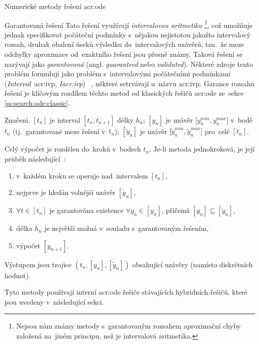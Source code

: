 \documentclass[thesis=M,czech]{FITthesis}[2012/06/26]
\newcommand{\acrlabel}[1]{acr:#1}
\newcommand{\acr}[1]{\acrshort{\acrlabel{#1}}}
\newcommand{\hl}[1]{\textit{#1}}
\newcommand{\name}[1]{\hl{#1}}
\newcommand{\cit}[1]{\cite{#1}}
\newcommand{\rf}[1]{\ref{#1}}
\newcommand{\pred}[1]{\ensuremath{\tilde{#1}}}
\begin{document}
\begin{section}{Numerické metody řešení \acr{ode}}

\begin{subsection}{Garantovaná řešení}\label{ss:search:ode:valid}
Tato řešení využívají \name{intervalovou aritmetiku}%
\footnote{Nejsou nám známy metody s~garantovaným rozsahem aproximační chyby
založená na~jiném principu, než je intervalová aritmetika.},
což umožňuje jednak specifikovat počáteční podmínky
s~nějakou nejistotou jakožto intervalový rozsah,
druhak obalení úseků výsledku do~intervalových uzávěrů,
tzn.~že meze odchylky aproximace od~exaktního řešení
jsou přesně známy.
Taková řešení se nazývají jako \name{garantovaná}
(angl. \name{guaranteed} nebo \name{validated}).
Některé zdroje tento problém formulují
jako problém s~intervalovými počátečními podmínkami
(\name{Interval}~\acr{ivp}, \name{I\acr{ivp}})%
~\cit{ode-valid-runge_kutta-art},
některé setrvávají u~názvu \acr{ivp}.
Garance rozsahu řešení je klíčovým rozdílem
těchto metod
od klasických řešičů \acr{ode}
ze~sekce \rf{ss:search:ode:classic}.


\begin{paragraph}{Značení.}\label{p:search:ode:valid:sign}
${[t_n]}$ je interval ${[t_{n}, t_{n+1}]}$ délky $h_n$;
${[y_n]}$ je uzávěr ${[y^{min}_{n}, y^{max}_{n}}]$ v~bodě $t_n$
(tj.~garantované meze řešení v~$t_n$);
${[\pred{y}_n]}$ je uzávěr ${[\pred{y}^{min}_{n}, \pred{y}^{max}_{n}}]$
pro~celé ${[t_n]}$.
\end{paragraph} %


\bigskip

Celý výpočet je rozdělen do~kroků v~bodech $t_n$.
Je-li metoda jednokroková,
je její průběh následující~\cit{ode-valid-runge_kutta-art}:
\begin{enumerate}
\item v~každém kroku se operuje nad~intervalem ${[t_{n}]}$,
\item nejprve je hledán volnější uzávěr ${[\pred{y}_n]}$,
\item ${\forall t \in [t_n]}$ je garantována existence
   ${\forall y_n \in [y_n]}$, přičemž
   ${[y_n] \subseteq [\pred{y}_n]}$,
\item délka $h_n$ je největší možná v~souladu s~garantovaným řešením,
\item výpočet ${[y_{n+1}]}$.
\end{enumerate}
Výstupem jsou trojice ${(t_n, [y_n], [\pred{y}_n])}$
obsahující uzávěry (namísto diskrétních hodnot).

Tyto metody používají interní \acr{ode} řešiče
stávajících hybridních řešičů,
které jsou uvedeny v~následující sekci.
\end{subsection} %


\end{section} %
\end{document}
